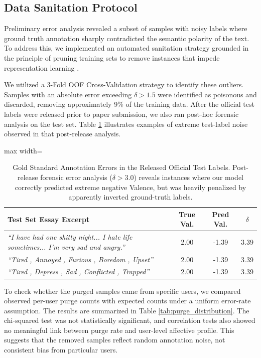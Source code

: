 \documentclass[11pt, a4paper]{article}
\begin{document}
\subsection{Data Sanitation Protocol}
Preliminary error analysis revealed a subset of samples with noisy labels where ground truth annotation sharply contradicted the semantic polarity of the text. To address this, we implemented an automated sanitation strategy grounded in the principle of pruning training sets to remove instances that impede representation learning \citep{angelova2005pruning}. 

We utilized a 3-Fold OOF Cross-Validation strategy to identify these outliers. Samples with an absolute error exceeding $\delta > 1.5$ were identified as poisonous and discarded, removing approximately 9\% of the training data. After the official test labels were released prior to paper submission, we also ran post-hoc forensic analysis on the test set. Table \ref{tab:poison_samples} illustrates examples of extreme test-label noise observed in that post-release analysis.

\begin{table}[H]
\centering
\begin{adjustbox}{max width=\columnwidth}
\begin{tabular}{p{5.5cm}|cc|c}
\toprule
\textbf{Test Set Essay Excerpt} & \textbf{True Val.} & \textbf{Pred Val.} & \textbf{$\delta$} \\ 
\midrule
\textit{``I have had one shitty night... I hate life sometimes... I'm very sad and angry.''} & 2.00 & -1.39 & 3.39 \\
\midrule
\textit{``Tired , Annoyed , Furious , Boredom , Upset''} & 2.00 & -1.39 & 3.39 \\
\midrule
\textit{``Tired , Depress , Sad , Conflicted , Trapped''} & 2.00 & -1.39 & 3.39 \\
\bottomrule
\end{tabular}
\end{adjustbox}
\caption{Gold Standard Annotation Errors in the Released Official Test Labels. Post-release forensic error analysis ($\delta > 3.0$) reveals instances where our model correctly predicted extreme negative Valence, but was heavily penalized by apparently inverted ground-truth labels.}
\label{tab:poison_samples}
\end{table}

To check whether the purged samples came from specific users, we compared observed per-user purge counts with expected counts under a uniform error-rate assumption. The results are summarized in Table \ref{tab:purge_distribution}. The chi-squared test was not statistically significant, and correlation tests also showed no meaningful link between purge rate and user-level affective profile. This suggests that the removed samples reflect random annotation noise, not consistent bias from particular users.
\end{document}

